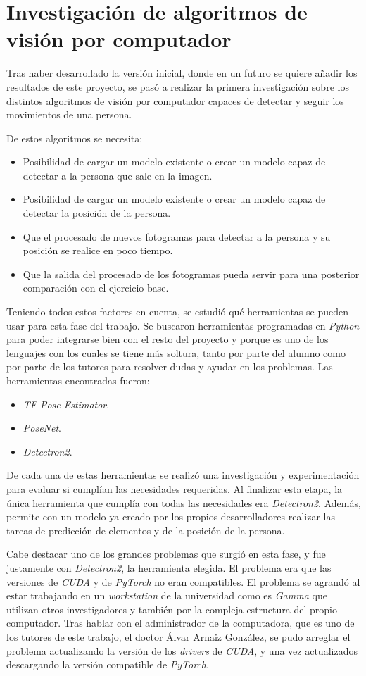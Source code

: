 {\section{Investigación de algoritmos de visión por computador} \label{aspc}
Tras haber desarrollado la versión inicial, donde en un futuro se quiere añadir los resultados de este proyecto, se pasó a realizar la primera investigación sobre los distintos algoritmos de visión por computador capaces de detectar y seguir los movimientos de una persona. 

De estos algoritmos se necesita:
\begin{itemize}
	\item Posibilidad de cargar un modelo existente o crear un modelo capaz de detectar a la persona que sale en la imagen.
	\item Posibilidad de cargar un modelo existente o crear un modelo capaz de detectar la posición de la persona.
	\item Que el procesado de nuevos fotogramas para detectar a la persona y su posición se realice en poco tiempo.
	\item Que la salida del procesado de los fotogramas pueda servir para una posterior comparación con el ejercicio base.
\end{itemize}

Teniendo todos estos factores en cuenta, se estudió qué herramientas se pueden usar para esta fase del trabajo. Se buscaron herramientas programadas en \textit{Python} para poder integrarse bien con el resto del proyecto y porque es uno de los lenguajes con los cuales se tiene más soltura, tanto por parte del alumno como por parte de los tutores para resolver dudas y ayudar en los problemas. Las herramientas encontradas fueron:
\begin{itemize}
	\item \textit{TF-Pose-Estimator}.
	\item \textit{PoseNet}.
	\item \textit{Detectron2}.
\end{itemize}

De cada una de estas herramientas se realizó una investigación y experimentación para evaluar si cumplían las necesidades requeridas. Al finalizar esta etapa, la única herramienta que cumplía con todas las necesidades era \textit{Detectron2}. Además, permite con un modelo ya creado por los propios desarrolladores realizar las tareas de predicción de elementos y de la posición de la persona.

Cabe destacar uno de los grandes problemas que surgió en esta fase, y fue justamente con \textit{Detectron2}, la herramienta elegida. El problema era que las versiones de \textit{CUDA} y de \textit{PyTorch} no eran compatibles. El problema se agrandó al estar trabajando en un \textit{workstation} de la universidad como es \textit{Gamma} que utilizan otros investigadores y también por la compleja estructura del propio computador. Tras hablar con el administrador de la computadora, que es uno de los tutores de este trabajo, el doctor Álvar Arnaiz González, se pudo arreglar el problema actualizando la versión de los \textit{drivers} de \textit{CUDA}, y una vez actualizados descargando la versión compatible de \textit{PyTorch}. 
}
